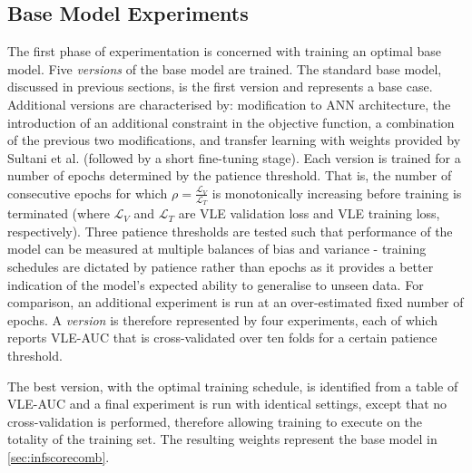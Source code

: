 \documentclass[sigplan,authorversion,nonacm, 9pt]{acmart}
\begin{document}
\subsection{Base Model Experiments}
The first phase of experimentation is concerned with training an optimal base model. Five \textit{versions} of the base model are trained. The standard base model, discussed in previous sections, is the first version and represents a base case. Additional versions are characterised by: modification to ANN architecture, the introduction of an additional constraint in the objective function, a combination of the previous two modifications, and transfer learning with weights provided by Sultani et al. (followed by a short fine-tuning stage).
Each version is trained for a number of epochs determined by the patience threshold. That is, the number of consecutive epochs for which $\rho = \frac{\mathcal{L}_{V}}{\mathcal{L}_T}$ is monotonically increasing before training is terminated (where $\mathcal{L}_{V}$ and $\mathcal{L}_T$ are VLE validation loss and VLE training loss, respectively).
Three patience thresholds are tested such that performance of the model can be measured at multiple balances of bias and variance - training schedules are dictated by patience rather than epochs as it provides a better indication of the model's expected ability to generalise to unseen data. For comparison, an additional experiment is run at an over-estimated fixed number of epochs. A \textit{version} is therefore represented by four experiments, each of which reports VLE-AUC that is cross-validated over ten folds for a certain patience threshold.
\par
The best version, with the optimal training schedule, is identified from a table of VLE-AUC and a final experiment is run with identical settings, except that no cross-validation is performed, therefore allowing training to execute on the totality of the training set. The resulting weights represent the base model in \ref{sec:infscorecomb}.
\end{document}
